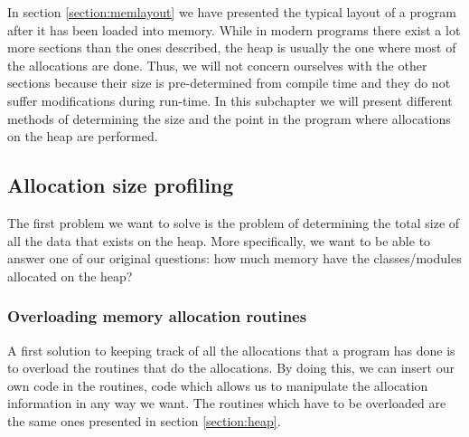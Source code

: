 In section \ref{section:memlayout} we have presented the typical layout of a program after it has been loaded into memory. While in modern programs there exist a lot more sections than the ones described, the heap is usually the one where most of the allocations are done. Thus, we will not concern ourselves with the other sections because their size is pre-determined from compile time and they do not suffer modifications during run-time. In this subchapter we will present different methods of determining the size and the point in the program where allocations on the heap are performed.

\subsection{Allocation size profiling}
\label{subsubsection:allocationsizeprofiling}

The first problem we want to solve is the problem of determining the total size of all the data that exists on the heap. More specifically, we want to be able to answer one of our original questions: how much memory have the classes/modules allocated on the heap?

\subsubsection{Overloading memory allocation routines}
\label{subsubsection:overridingroutines}

A first solution to keeping track of all the allocations that a program has done is to overload the routines that do the allocations. By doing this, we can insert our own code in the routines, code which allows us to manipulate the allocation information in any way we want. The routines which have to be overloaded are the same ones presented in section \ref{section:heap}.

